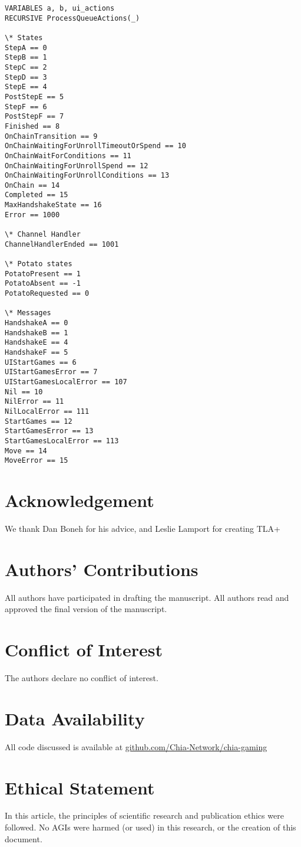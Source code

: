 \documentclass[a4paper]{article}
\begin{document}
\begin{multicols}{2}
\begin{verbatim}
VARIABLES a, b, ui_actions
RECURSIVE ProcessQueueActions(_)

\* States
StepA == 0
StepB == 1
StepC == 2
StepD == 3
StepE == 4
PostStepE == 5
StepF == 6
PostStepF == 7
Finished == 8
OnChainTransition == 9
OnChainWaitingForUnrollTimeoutOrSpend == 10
OnChainWaitForConditions == 11
OnChainWaitingForUnrollSpend == 12
OnChainWaitingForUnrollConditions == 13
OnChain == 14
Completed == 15
MaxHandshakeState == 16
Error == 1000

\* Channel Handler
ChannelHandlerEnded == 1001

\* Potato states
PotatoPresent == 1
PotatoAbsent == -1
PotatoRequested == 0

\* Messages
HandshakeA == 0
HandshakeB == 1
HandshakeE == 4
HandshakeF == 5
UIStartGames == 6
UIStartGamesError == 7
UIStartGamesLocalError == 107
Nil == 10
NilError == 11
NilLocalError == 111
StartGames == 12
StartGamesError == 13
StartGamesLocalError == 113
Move == 14
MoveError == 15
\end{verbatim}

\twocolumn
\section*{Acknowledgement}
We thank Dan Boneh for his advice, and Leslie Lamport for creating TLA+

\section*{Authors' Contributions}
All authors have participated in drafting the manuscript. All authors read and approved the final version of the manuscript.

\section*{Conflict of Interest}
The authors declare no conflict of interest.

\section*{Data Availability}
All code discussed is available at \href{https://github.com/Chia-Network/chia-gaming}{github.com/Chia-Network/chia-gaming}

\section*{Ethical Statement}
In this article, the principles of scientific research and publication ethics were followed. No AGIs were harmed (or used) in this research, or the creation of this document.


\end{multicols}
\end{document}
